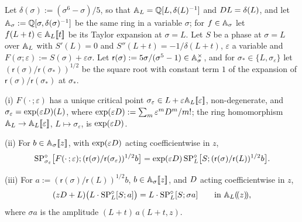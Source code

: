\begin{lem}
\label{lem:fsp-generic}
Let $\delta(\sigma):=(\sigma^6-\sigma)/5$, so that $\mathbb{A}_{L}=\mathbb{Q}[L,\delta(L)^{-1}]$ and $D L=\delta(L)$, and let $\mathbb{A}_\sigma:=\mathbb{Q}[\sigma,\delta(\sigma)^{-1}]$ be the same ring in a variable $\sigma$; for $f\in\mathbb{A}_\sigma$ let $f(L+t)\in\mathbb{A}_{L}[\![ t ]\!]$ be its Taylor expansion at $\sigma=L$. Let $S$ be a phase at $\sigma=L$ over $\mathbb{A}_{L}$ with $S'(L)=0$ and $S''(L+t)=-1/\delta(L+t)$, $\varepsilon$ a variable and $F(\sigma;\varepsilon):=S(\sigma)+\varepsilon\sigma$. Let $\mathsf r(\sigma):=5\sigma/(\sigma^5-1)\in\mathbb{A}_\sigma^\times$, and for $\sigma_\ast\in\{L,\sigma_\varepsilon\}$ let $(\mathsf r(\sigma)/\mathsf r(\sigma_\ast))^{1/2}$ be the square root with constant term $1$ of the expansion of $\mathsf r(\sigma)/\mathsf r(\sigma_\ast)$ at $\sigma_\ast$.

(i) $F(\cdot\,;\varepsilon)$ has a unique critical point $\sigma_\varepsilon\in L+\varepsilon\mathbb{A}_{L}[\![ \varepsilon ]\!]$, non-degenerate, and $\sigma_\varepsilon=\exp(\varepsilon D)(L)$, where $\exp(\varepsilon D):=\sum_m\varepsilon^mD^m/m!$; the ring homomorphism $\mathbb{A}_{L}\to\mathbb{A}_{L}[\![ \varepsilon ]\!]$, $L\mapsto\sigma_\varepsilon$, is $\exp(\varepsilon D)$.

(ii) For $b\in\mathbb{A}_\sigma[\![ z ]\!]$, with $\exp(\varepsilon D)$ acting coefficientwise in $z$,
\[
\mathrm{SP}^{\circ}_{\sigma_\varepsilon}\bigl[F(\cdot\,;\varepsilon);(\mathsf r(\sigma)/\mathsf r(\sigma_\varepsilon))^{1/2}b\bigr]=\exp(\varepsilon D)\,\mathrm{SP}^{\circ}_L\bigl[S;(\mathsf r(\sigma)/\mathsf r(L))^{1/2}b\bigr].
\]

(iii) For $a:=(\mathsf r(\sigma)/\mathsf r(L))^{1/2}b$, $b\in\mathbb{A}_\sigma[\![ z ]\!]$, and $D$ acting coefficientwise in $z$,
\begin{equation}
\label{eq:fsp-generic}
(zD+L)\bigl(L\cdot\mathrm{SP}^{\circ}_L[S;a]\bigr)=L\cdot\mathrm{SP}^{\circ}_L[S;\sigma a]\qquad\text{in }\mathbb{A}_{L}(\!(z)\!),
\end{equation}
where $\sigma a$ is the amplitude $(L+t)\,a(L+t,z)$.
\end{lem}

